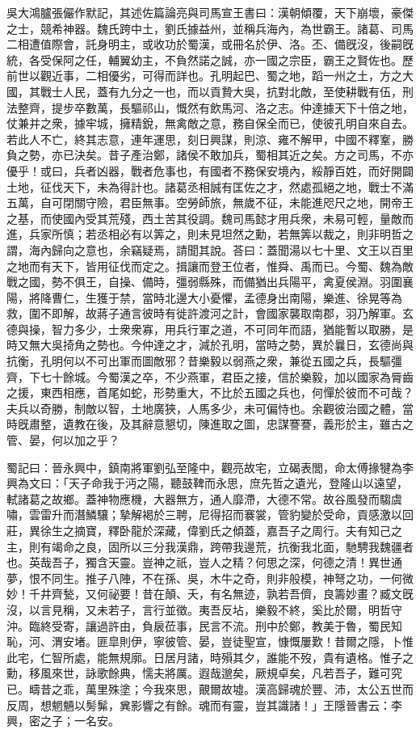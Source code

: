 \begin{pinyinscope}
吳大鴻臚張儼作默記，其述佐篇論亮與司馬宣王書曰：漢朝傾覆，天下崩壞，豪傑之士，競希神器。魏氏跨中土，劉氏據益州，並稱兵海內，為世霸王。諸葛、司馬二相遭值際會，託身明主，或收功於蜀漢，或冊名於伊、洛。丕、備旣沒，後嗣旣統，各受保阿之任，輔翼幼主，不負然諾之誠，亦一國之宗臣，霸王之賢佐也。歷前世以觀近事，二相優劣，可得而詳也。孔明起巴、蜀之地，蹈一州之土，方之大國，其戰士人民，蓋有九分之一也，而以貢贄大吳，抗對北敵，至使耕戰有伍，刑法整齊，提步卒數萬，長驅祁山，慨然有飲馬河、洛之志。仲達據天下十倍之地，仗兼并之衆，據牢城，擁精銳，無禽敵之意，務自保全而已，使彼孔明自來自去。若此人不亡，終其志意，連年運思，刻日興謀，則涼、雍不解甲，中國不釋鞌，勝負之勢，亦已決矣。昔子產治鄭，諸侯不敢加兵，蜀相其近之矣。方之司馬，不亦優乎！或曰，兵者凶器，戰者危事也，有國者不務保安境內，綏靜百姓，而好開闢土地，征伐天下，未為得計也。諸葛丞相誠有匡佐之才，然處孤絕之地，戰士不滿五萬，自可閉關守險，君臣無事。空勞師旅，無歲不征，未能進咫尺之地，開帝王之基，而使國內受其荒殘，西土苦其役調。魏司馬懿才用兵衆，未易可輕，量敵而進，兵家所慎；若丞相必有以筭之，則未見坦然之勳，若無筭以裁之，則非明哲之謂，海內歸向之意也，余竊疑焉，請聞其說。荅曰：蓋聞湯以七十里、文王以百里之地而有天下，皆用征伐而定之。揖讓而登王位者，惟舜、禹而已。今蜀、魏為敵戰之國，勢不俱王，自操、備時，彊弱縣殊，而備猶出兵陽平，禽夏侯淵。羽圍襄陽，將降曹仁，生獲于禁，當時北邊大小憂懼，孟德身出南陽，樂進、徐晃等為救，圍不即解，故蔣子通言彼時有徙許渡河之計，會國家襲取南郡，羽乃解軍。玄德與操，智力多少，士衆衆寡，用兵行軍之道，不可同年而語，猶能暫以取勝，是時又無大吳掎角之勢也。今仲達之才，減於孔明，當時之勢，異於曩日，玄德尚與抗衡，孔明何以不可出軍而圖敵邪？昔樂毅以弱燕之衆，兼從五國之兵，長驅彊齊，下七十餘城。今蜀漢之卒，不少燕軍，君臣之接，信於樂毅，加以國家為脣齒之援，東西相應，首尾如蛇，形勢重大，不比於五國之兵也，何憚於彼而不可哉？夫兵以奇勝，制敵以智，土地廣狹，人馬多少，未可偏恃也。余觀彼治國之體，當時旣肅整，遺教在後，及其辭意懇切，陳進取之圖，忠謀謇謇，義形於主，雖古之管、晏，何以加之乎？

蜀記曰：晉永興中，鎮南將軍劉弘至隆中，觀亮故宅，立碣表閭，命太傅掾犍為李興為文曰：「天子命我于沔之陽，聽鼓鞞而永思，庶先哲之遺光，登隆山以遠望，軾諸葛之故鄉。蓋神物應機，大器無方，通人靡滯，大德不常。故谷風發而騶虞嘯，雲雷升而潛鱗驤；摯解褐於三聘，尼得招而褰裳，管豹變於受命，貢感激以回莊，異徐生之摘寶，釋卧龍於深藏，偉劉氏之傾蓋，嘉吾子之周行。夫有知己之主，則有竭命之良，固所以三分我漢鼎，跨帶我邊荒，抗衡我北面，馳騁我魏疆者也。英哉吾子，獨含天靈。豈神之祇，豈人之精？何思之深，何德之清！異世通夢，恨不同生。推子八陣，不在孫、吳，木牛之奇，則非般模，神弩之功，一何微妙！千井齊甃，又何祕要！昔在顛、夭，有名無迹，孰若吾儕，良籌妙畫？臧文旣沒，以言見稱，又未若子，言行並徵。夷吾反坫，樂毅不終，奚比於爾，明哲守沖。臨終受寄，讓過許由，負扆莅事，民言不流。刑中於鄭，教美于魯，蜀民知恥，河、渭安堵。匪皐則伊，寧彼管、晏，豈徒聖宣，慷慨屢歎！昔爾之隱，卜惟此宅，仁智所處，能無規廓。日居月諸，時殞其夕，誰能不歿，貴有遺格。惟子之勳，移風來世，詠歌餘典，懦夫將厲。遐哉邈矣，厥規卓矣，凡若吾子，難可究已。疇昔之乖，萬里殊塗；今我來思，覿爾故墟。漢高歸魂於豐、沛，太公五世而反周，想魍魎以髣髴，兾影響之有餘。魂而有靈，豈其識諸！」王隱晉書云：李興，密之子；一名安。


\end{pinyinscope}